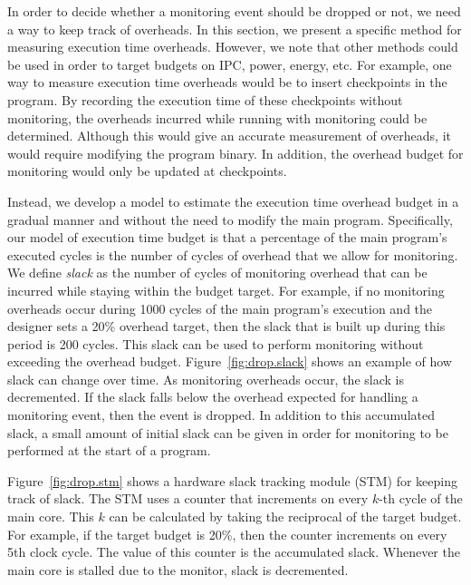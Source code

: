 In order to decide whether a monitoring event should be dropped or not, we need
a way to keep track of overheads. In this section, we present a specific method
for measuring execution time overheads. However, we note that other methods
could be used in order to target budgets on IPC, power, energy, etc.  For
example, one way to measure execution time overheads would be to insert
checkpoints in the program. By recording the execution time of these
checkpoints without monitoring, the overheads incurred while running with
monitoring could be determined. Although this would give an accurate
measurement of overheads, it would require modifying the program binary. In
addition, the overhead budget for monitoring would only be updated at
checkpoints.

Instead, we develop a model to estimate the execution time overhead budget in a
gradual manner and without the need to modify the main program. Specifically,
our model of execution time budget is that a percentage of the main program's
executed cycles is the number of cycles of overhead that we allow for
monitoring.  We define \emph{slack} as the number of cycles of monitoring
overhead that can be incurred while staying within the budget target.  For
example, if no monitoring overheads occur during 1000 cycles of the main
program's execution and the designer sets a 20\% overhead target, then the
slack that is built up during this period is 200 cycles. This slack can be used
to perform monitoring without exceeding the overhead budget.
Figure~\ref{fig:drop.slack} shows an example of how slack can change over time.
As monitoring overheads occur, the slack is decremented. If the slack falls
below the overhead expected for handling a monitoring event, then the event is
dropped. In addition to this accumulated slack, a small amount of initial slack
can be given in order for monitoring to be performed at the start of a program.

Figure~\ref{fig:drop.stm} shows a hardware slack tracking module (STM) for
keeping track of slack. The STM uses a counter that increments on every $k$-th
cycle of the main core. This $k$ can be calculated by taking the reciprocal of
the target budget. For example, if the target budget is 20\%, then the counter
increments on every 5th clock cycle.  The value of this counter is the
accumulated slack.  Whenever the main core is stalled due to the monitor, slack
is decremented.


